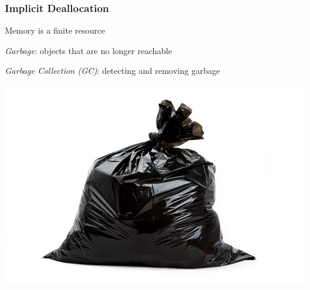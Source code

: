 \documentclass{beamer}
\newcommand{\linespace}{\vskip 0.25cm}
\begin{document}
\begin{frame}

\frametitle{Implicit Deallocation}

Memory is a finite resource

\linespace
\linespace

\emph{Garbage}: objects that are no longer reachable

\linespace
\linespace

\emph{Garbage Collection (GC)}: detecting and removing garbage

\linespace
\linespace
\linespace

\begin{center}
\includegraphics[width=.3\textwidth]{Illustrations/garbage.jpg}
\end{center}

\end{frame}
\end{document}
